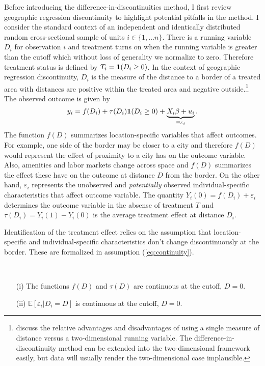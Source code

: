 \documentclass[12pt]{article}
\begin{document}
Before introducing the difference-in-discontinuities method, I first review geographic regression discontinuity to highlight potential pitfalls in the method. I consider the standard context of an independent and identically distributed random cross-sectional sample of units $i \in \{1, \dots n\}$. There is a running variable $D_i$ for observation $i$ and treatment turns on when the running variable is greater than the cutoff which without loss of generality we normalize to zero. Therefore treatment status is defined by $T_i = \mathbf{1}(D_i \geq 0)$. In the context of geographic regression discontinuity, $D_i$ is the measure of the distance to a border of a treated area with distances are positive within the treated area and negative outside.\footnote{\citet{Keele_Titiunik_2015} discuss the relative advantages and disadvantages of using a single measure of distance versus a two-dimensional running variable. The difference-in-discontinuity method can be extended into the two-dimensional framework easily, but data will usually render the two-dimensional case implausible.} The observed outcome is given by 
$$
    y_i = f(D_i) + \tau(D_i) \mathbf{1}(D_i \geq 0) + \underbrace{X_i \beta + u_i}_{\equiv \varepsilon_i}. 
$$
The function $f(D)$ summarizes location-specific variables that affect outcomes. For example, one side of the border may be closer to a city and therefore $f(D)$ would represent the effect of proximity to a city has on the outcome variable. Also, amenities and labor markets change across space and $f(D)$ summarizes the effect these have on the outcome at distance $D$ from the border. On the other hand, $\varepsilon_i$ represents the unobserved and \emph{potentially} observed individual-specific characteristics that affect outcome variable. The quantity $Y_{i}(0) = f(D_i) + \varepsilon_i$ determines the outcome variable in the absense of treatment $T$ and $\tau(D_i) = Y_i(1) - Y_i(0)$ is the average treatment effect at distance $D_i$. 

Identification of the treatment effect relies on the assumption that location-specific and individual-specific characteristics don't change discontinuously at the border. These are formalized in assumption (\ref{eq:continuity}).

\begin{assumption}[RD]\label{eq:continuity}\ \\\vspace{-10mm} 
    \begin{itemize}
        \item[(i)] The functions $f(D)$ and $\tau(D)$ are continuous at the cutoff, $D = 0$. 
        \item[(ii)] $\mathbb{E}\left[ \varepsilon_i \vert D_i = D \right]$ is continuous at the cutoff, $D = 0$. 
    \end{itemize}
\end{assumption}
\end{document}
